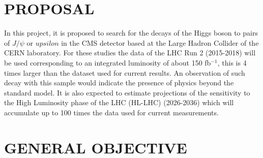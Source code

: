 \documentclass[final,3p]{CSP}
\begin{document}
\newpage
\section{PROPOSAL}

\onehalfspacing In this project, it is proposed to search for the decays of the Higgs boson to pairs of $J/\psi$ or $upsilon$ in the CMS detector based at the Large Hadron Collider of the CERN laboratory. For these studies the data of the LHC Run 2 (2015-2018) will be used corresponding to an integrated luminosity of about 150 fb$^{-1}$, this is 4 times larger than the dataset used for current results. An observation of such decay  with this sample would indicate the presence of physics beyond the standard model. It is also expected to estimate projections of the sensitivity to the High Luminosity phase of the LHC (HL-LHC) (2026-2036) which will accumulate up to 100 times the data used for current measurements. 







\section{GENERAL OBJECTIVE}

\end{document}
